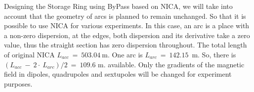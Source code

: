 \documentclass[25pt, a0paper, portrait, blockverticalspace=.5cm]{tikzposter}
\begin{document}
\begin{columns}
{		\begin{minipage}{0.51\linewidth}
		\end{minipage}
		\begin{minipage}{0.49\linewidth}
			\par Designing the Storage Ring using ByPass based on NICA, 
we will take into account that the geometry of arcs is planned to remain unchanged. 
So that it is possible to use NICA for various experiments. 
In this case, an arc is a place with a non-zero dispersion, at the edges, 
both dispersion and its derivative take a zero value, thus the straight section has zero dispersion throughout. 
The total length of original NICA $L_{acc}~=~503.04~$m. One arc is $L_{arc}~=~142.15$~m. 
So, there is $(L_{acc}~-~2\cdot~L_{arc})/2~=~109.6$ m. available.
Only the gradients of the magnetic field in dipoles, quadrupoles and sextupoles will be changed for experiment purposes.
		\end{minipage}			
\newline
\newline
\newline
		\begin{minipage}{0.514\linewidth}

\end{minipage}}
\end{columns}
\end{document}
